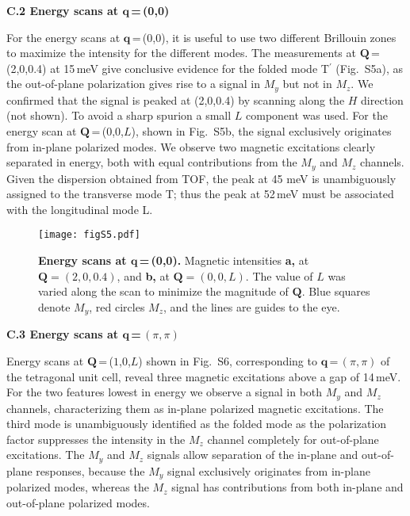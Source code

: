 \documentclass[twocolumn,prb,aps,showpacs]{revtex4-1}
\begin{document}
\vspace{10 pt}
\noindent
{\bf C.2 Energy scans at $\mathbf{q}$\,=\,(0,0)}
\vspace{10 pt}

\noindent
For the energy scans at $\mathbf{q}$\,=\,(0,0), it is useful to use two different Brillouin zones to maximize the intensity for the different modes. The measurements at $\mathbf{Q}$\,=\,(2,0,0.4) at 15\,meV give conclusive evidence for the folded mode T$^\prime$ (Fig.~S5a), as the out-of-plane polarization gives rise to a signal in $M_y$ but not in $M_z$. We confirmed that the signal is peaked at (2,0,0.4) by scanning along the $H$ direction (not shown). To avoid a sharp spurion a small $L$ component was used. 
For the energy scan at $\mathbf{Q}$\,=\,(0,0,$L$), shown in Fig.~S5b, the signal exclusively originates from in-plane polarized modes. We observe two magnetic excitations clearly separated in energy, both with equal contributions from the $M_{y}$ and $M_{z}$ channels. Given the dispersion obtained from TOF, the peak at 45 meV is unambiguously assigned to the transverse mode T; thus the peak at 52\,meV must be associated with the longitudinal mode L.
\begin{figure}
  \centering
  \texttt{[image: figS5.pdf]}
\renewcommand{\thefigure}{S\arabic{figure}}
  \caption{{\bf Energy scans at $\mathbf{q}$\,=\,(0,0).} Magnetic intensities {\bf a,} at $\mathbf{Q}=(2,0,0.4)$, and {\bf b,} at $\mathbf{Q}=(0,0,L)$. The value of $L$ was varied along the scan to minimize the magnitude of $\mathbf{Q}$. Blue squares denote $M_y$, red circles $M_z$, and the lines are guides to the eye.}

\end{figure}


\vspace{10 pt}
\noindent
{\bf C.3 Energy scans at $\mathbf{q}$\,=\,$(\pi,\pi)$}
\vspace{10 pt}

\noindent
Energy scans at $\mathbf{Q}$\,=\,($1$,0,$L$) shown in Fig.~S6, corresponding to  $\mathbf{q}$\,=\,$(\pi,\pi)$ of the tetragonal unit cell, reveal three magnetic excitations above a gap of 14\,meV. For the two features lowest in energy we observe a signal in both $M_y$ and $M_z$ channels, characterizing them as in-plane polarized magnetic excitations. %
The third mode is unambiguously identified as the folded mode as the polarization factor suppresses the intensity in the $M_{z}$ channel completely for out-of-plane excitations. The $M_y$ and $M_z$ signals allow separation of the in-plane and out-of-plane responses, because the $M_y$ signal exclusively originates from in-plane polarized modes, whereas the $M_z$ signal has contributions from both in-plane and out-of-plane polarized modes.
\end{document}
